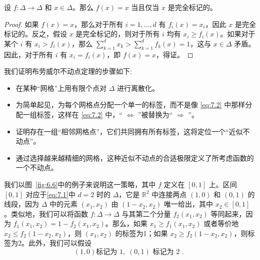 \begin{lemma}\label{lem:7.1}
设 \(f : \Delta  \rightarrow  \Delta\) 和 \(x \in  \Delta\)。那么 \(f\left( x\right)  = x\) 当且仅当 \(x\) 是完全标记的。
\end{lemma}
\begin{proof}
如果 \(f\left( x\right)  = x\)，那么对于所有 \(i = 1,\ldots,d\) 有 \({f}_{i}\left( x\right)  = {x}_{i}\)，因此 \(x\) 是完全标记的。反之，假设 \(x\) 是完全标记的，则对于所有 \(i\) 均有 \({x}_{i} \geq  {f}_{i}\left( x\right)\)。如果对于某个 \(i\) 有 \({x}_{i} > {f}_{i}\left( x\right)\)，那么 \(\sum _{{k = 1}}^{d}{x}_{k} > \sum_{{k = 1}}^{d}{f}_{k}\left( x\right)  = 1\)，这与 \(x \in  \Delta\) 矛盾。因此，对于所有 \(i\) 有 \({x}_{i} = {f}_{i}\left( x\right)\)，即 \(f\left( x\right)  = x\)，得证。
\end{proof}

我们证明布劳威尔不动点定理的步骤如下:
\begin{itemize}
\item 在某种“网格”上用有限个点对 \(\Delta\) 进行离散化。
\item 为简单起见，为每个网格点分配一个单一的标签，而不是像 \eqref{eq:7.2} 中那样分配一组标签，这样在 \eqref{eq:7.2} 中，“ \(\Leftrightarrow\) ”被替换为“ \(\Rightarrow\) ”。
\item 证明存在一组“相邻网格点”，它们共同拥有所有标签，这将定位一个“近似不动点”。
\item 通过选择越来越精细的网格，这种近似不动点的合适极限定义了所考虑函数的一个不动点。
\end{itemize}

我们以图~\ref{fig:6.6}中的例子来说明这一策略，其中 \(f\) 定义在 \(\left\lbrack  {0,1}\right\rbrack\) 上。区间 \(\left\lbrack  {0,1}\right\rbrack\) 对应于\eqref{eq:7.1}中 \(d = 2\) 时的 \(\Delta\)，它是 \({\mathbb{R}}^{2}\) 中连接两点 $(1,0)$ 和 $(0,1)$ 的线段，因为 \(\Delta\) 中的元素 \(\left( {{x}_{1},{x}_{2}}\right)\) 由 \(\left( {1 - {x}_{2},{x}_{2}}\right)\) 唯一给出，其中 \({x}_{2} \in  \left\lbrack  {0,1}\right\rbrack\)。类似地，我们可以将函数 \(f : \Delta  \rightarrow  \Delta\) 与其第二个分量 \({f}_{2}\left( {{x}_{1},{x}_{2}}\right)\) 等同起来，因为 \({f}_{1}\left( {{x}_{1},{x}_{2}}\right)  = 1 - {f}_{2}\left( {{x}_{1},{x}_{2}}\right)\)。那么，如果 \({x}_{1} \geq  {f}_{1}\left( {{x}_{1},{x}_{2}}\right)\) 或者等价地 \({x}_{2} \leq  {f}_{2}\left( {1 - {x}_{2},{x}_{2}}\right)\)，则 \(\left( {{x}_{1},{x}_{2}}\right)\) 的标签为1；如果 \({x}_{2} \geq  {f}_{2}\left( {1 - {x}_{2},{x}_{2}}\right)\)，则标签为2。此外，我们可以假设
\begin{equation}
\left( {1,0}\right) \text{标记为 }1,\;\left( {0,1}\right) \text{ 标记为 2 . }\label{eq:7.3}
\end{equation}

